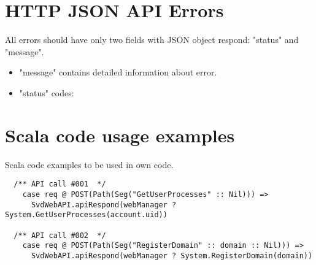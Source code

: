 \documentclass[11pt,a4paper]{scrartcl}
\begin{document}
\section{HTTP JSON API Errors}\label{sec:apierrors}
  All errors should have only two fields with JSON object respond: "status" and "message".

  \begin{itemize}
    \item "message" contains detailed information about error.
    \item "status" codes:

  \end{itemize}


\section{Scala code usage examples}\label{sec:scalausage}
  Scala code examples to be used in own code.

  \begin{verbatim}
  /** API call #001  */
    case req @ POST(Path(Seg("GetUserProcesses" :: Nil))) =>
      SvdWebAPI.apiRespond(webManager ? System.GetUserProcesses(account.uid))

  /** API call #002  */
    case req @ POST(Path(Seg("RegisterDomain" :: domain :: Nil))) =>
      SvdWebAPI.apiRespond(webManager ? System.RegisterDomain(domain))

  \end{verbatim}
\end{document}
